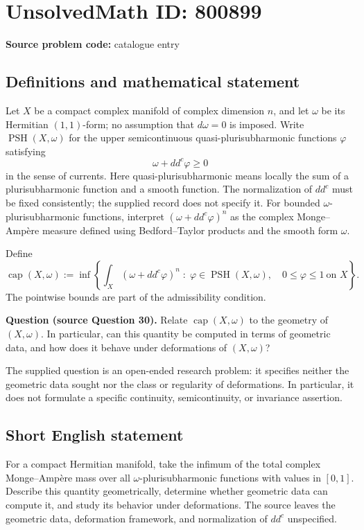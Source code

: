\documentclass[11pt]{article}
\begin{document}
\section*{UnsolvedMath ID: 800899}
\textbf{Source problem code:} catalogue entry
\subsection{Definitions and mathematical statement}
Let \(X\) be a compact complex manifold of complex dimension \(n\), and let \(\omega\) be its Hermitian \((1,1)\)-form; no assumption that \(d\omega=0\) is imposed. Write \(\operatorname{PSH}(X,\omega)\) for the upper semicontinuous quasi-plurisubharmonic functions \(\varphi\) satisfying
\[
\omega+dd^c\varphi\geq 0
\]
in the sense of currents. Here quasi-plurisubharmonic means locally the sum of a plurisubharmonic function and a smooth function. The normalization of \(dd^c\) must be fixed consistently; the supplied record does not specify it. For bounded \(\omega\)-plurisubharmonic functions, interpret \((\omega+dd^c\varphi)^n\) as the complex Monge--Amp\`ere measure defined using Bedford--Taylor products and the smooth form \(\omega\).

Define
\[
\operatorname{cap}(X,\omega)
:=\inf\left\{
\int_X(\omega+dd^c\varphi)^n
\;:\;
\varphi\in\operatorname{PSH}(X,\omega),\quad
0\leq\varphi\leq1\ \text{on }X
\right\}.
\]
The pointwise bounds are part of the admissibility condition.

\textbf{Question (source Question 30).} Relate \(\operatorname{cap}(X,\omega)\) to the geometry of \((X,\omega)\). In particular, can this quantity be computed in terms of geometric data, and how does it behave under deformations of \((X,\omega)\)?

The supplied question is an open-ended research problem: it specifies neither the geometric data sought nor the class or regularity of deformations. In particular, it does not formulate a specific continuity, semicontinuity, or invariance assertion.
\subsection{Short English statement}
For a compact Hermitian manifold, take the infimum of the total complex Monge--Amp\`ere mass over all \(\omega\)-plurisubharmonic functions with values in \([0,1]\). Describe this quantity geometrically, determine whether geometric data can compute it, and study its behavior under deformations. The source leaves the geometric data, deformation framework, and normalization of \(dd^c\) unspecified.
\end{document}
